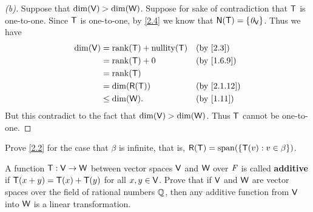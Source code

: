\begin{proof}[(b)]
  Suppose that \(\dim(\mathsf{V}) > \dim(\mathsf{W})\).
  Suppose for sake of contradiction that \(\mathsf{T}\) is one-to-one.
  Since \(\mathsf{T}\) is one-to-one, by \cref{2.4} we know that \(\ns{\T} = \set{\zv_{\V}}\).
  Thus we have
  \begin{align*}
    \dim(\V) & = \rk{\T} + \nt{\T} &  & \text{(by \cref{2.3})}    \\
             & = \rk{\T} + 0       &  & \text{(by \cref{1.6.9})}  \\
             & = \rk{\T}                                          \\
             & = \dim(\rg{\T})     &  & \text{(by \cref{2.1.12})} \\
             & \leq \dim(\W).      &  & \text{(by \cref{1.11})}
  \end{align*}
  But this contradict to the fact that \(\dim(\mathsf{V}) > \dim(\mathsf{W})\).
  Thus \(\mathsf{T}\) cannot be one-to-one.
\end{proof}

\begin{ex}\label{ex:2.1.33}
  Prove \cref{2.2} for the case that \(\beta\) is infinite, that is, \(\rg{\T} = \spn{\set{\T(v) : v \in \beta}}\).
\end{ex}

\begin{ex}\label{ex:2.1.37}
  A function \(\mathsf{T} : \mathsf{V} \to \mathsf{W}\) between vector spaces \(\mathsf{V}\) and \(\mathsf{W}\) over \(\mathit{F}\) is called \textbf{additive} if \(\mathsf{T}(x + y) = \mathsf{T}(x) + \mathsf{T}(y)\) for all \(x, y \in \mathsf{V}\).
  Prove that if \(\mathsf{V}\) and \(\mathsf{W}\) are vector spaces over the field of rational numbers \(\mathbb{Q}\), then any additive function from \(\mathsf{V}\) into \(\mathsf{W}\) is a linear transformation.
\end{ex}
